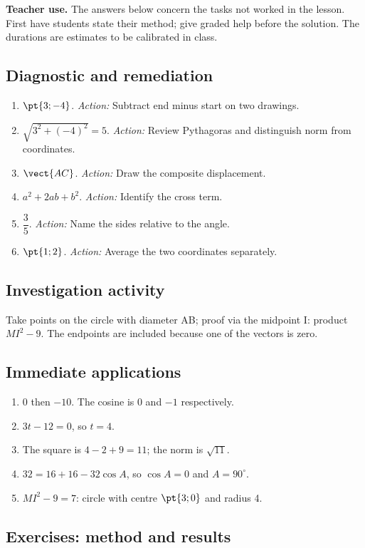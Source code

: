 \label{C03-CORR}
\textbf{Teacher use.} The answers below concern the tasks not worked in the lesson. First have students state their method; give graded help before the solution. The durations are estimates to be calibrated in class.
\subsection*{Diagnostic and remediation}
\begin{enumerate}
\item $\pt{3;-4}$. \textit{Action:} Subtract end minus start on two drawings.
\item $\sqrt{3^2+(-4)^2}=5$. \textit{Action:} Review Pythagoras and distinguish norm from coordinates.
\item $\vect{AC}$. \textit{Action:} Draw the composite displacement.
\item $a^2+2ab+b^2$. \textit{Action:} Identify the cross term.
\item $\dfrac{3}{5}$. \textit{Action:} Name the sides relative to the angle.
\item $\pt{1;2}$. \textit{Action:} Average the two coordinates separately.
\end{enumerate}
\subsection*{Investigation activity}
Take points on the circle with diameter AB; proof via the midpoint I: product $MI^2-9$. The endpoints are included because one of the vectors is zero.
\subsection*{Immediate applications}
\begin{enumerate}
\item $0$ then $-10$. The cosine is 0 and $-1$ respectively.
\item $3t-12=0$, so $t=4$.
\item The square is $4-2+9=11$; the norm is $\sqrt{11}$.
\item $32=16+16-32\cos A$, so $\cos A=0$ and $A=90^\circ$.
\item $MI^2-9=7$: circle with centre $\pt{3;0}$ and radius 4.
\end{enumerate}
\subsection*{Exercises: method and results}
